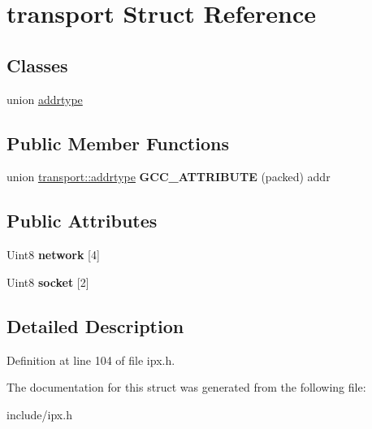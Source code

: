 \hypertarget{structtransport}{\section{transport Struct Reference}
\label{structtransport}
}
\subsection*{Classes}
\begin{DoxyCompactItemize}
\item 
union \hyperlink{uniontransport_1_1addrtype}{addrtype}
\end{DoxyCompactItemize}
\subsection*{Public Member Functions}
\begin{DoxyCompactItemize}
\item 
\hypertarget{structtransport_ada10cf957e08a08da9d493f9c789b1c2}{union \hyperlink{uniontransport_1_1addrtype}{transport\-::addrtype} {\bfseries G\-C\-C\-\_\-\-A\-T\-T\-R\-I\-B\-U\-T\-E} (packed) addr}\label{structtransport_ada10cf957e08a08da9d493f9c789b1c2}

\end{DoxyCompactItemize}
\subsection*{Public Attributes}
\begin{DoxyCompactItemize}
\item 
\hypertarget{structtransport_a5c39627b6ac9ccefbbc0c8c28f1419cf}{Uint8 {\bfseries network} \mbox{[}4\mbox{]}}\label{structtransport_a5c39627b6ac9ccefbbc0c8c28f1419cf}

\item 
\hypertarget{structtransport_a8f586eacafea0e55e7a17b2a29b23e9b}{Uint8 {\bfseries socket} \mbox{[}2\mbox{]}}\label{structtransport_a8f586eacafea0e55e7a17b2a29b23e9b}

\end{DoxyCompactItemize}


\subsection{Detailed Description}


Definition at line 104 of file ipx.\-h.



The documentation for this struct was generated from the following file\-:\begin{DoxyCompactItemize}
\item 
include/ipx.\-h\end{DoxyCompactItemize}
